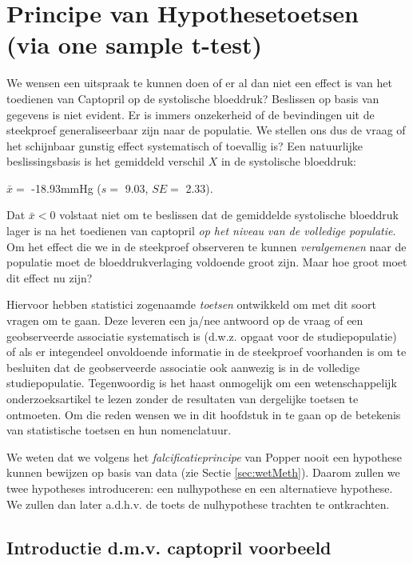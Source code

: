 \documentclass[
  12pt,dutch,coursenotes]{book}
\theoremstyle{definition}
\theoremstyle{definition}
\theoremstyle{definition}
\theoremstyle{remark}
\begin{document}
\hypertarget{principe-van-hypothesetoetsen-via-one-sample-t-test}{%
\section{Principe van Hypothesetoetsen (via one sample t-test)}\label{principe-van-hypothesetoetsen-via-one-sample-t-test}}

We wensen een uitspraak te kunnen doen of er al dan niet een effect is van het toedienen van Captopril op de systolische bloeddruk? Beslissen op basis van gegevens is niet evident. Er is immers onzekerheid of de bevindingen uit de steekproef
generaliseerbaar zijn naar de populatie. We stellen ons dus de vraag of het schijnbaar gunstig effect systematisch of toevallig is?
Een natuurlijke beslissingsbasis is het gemiddeld verschil \(X\) in de systolische bloeddruk:

\(\bar x=\) -18.93mmHg (\(s =\) 9.03, \(SE =\) 2.33).

Dat \(\bar{x}< 0\) volstaat niet om te beslissen dat de gemiddelde systolische bloeddruk lager is na het toedienen van captopril \emph{op het niveau van de volledige populatie}. Om het effect die we in de steekproef observeren te kunnen \emph{veralgemenen} naar de populatie moet de bloeddrukverlaging voldoende groot zijn. Maar hoe groot moet dit effect nu zijn?

Hiervoor hebben statistici zogenaamde \emph{toetsen} ontwikkeld om met dit soort vragen om te gaan. Deze leveren een ja/nee antwoord op de vraag of een geobserveerde associatie systematisch is (d.w.z. opgaat voor de studiepopulatie) of als er integendeel onvoldoende informatie in de steekproef voorhanden is om te besluiten dat de geobserveerde associatie ook aanwezig is in de volledige studiepopulatie. Tegenwoordig is het
haast onmogelijk om een wetenschappelijk onderzoeksartikel te lezen zonder
de resultaten van dergelijke toetsen te ontmoeten. Om die reden wensen we in
dit hoofdstuk in te gaan op de betekenis van statistische toetsen en hun
nomenclatuur.

We weten dat we volgens het \emph{falcificatieprincipe} van Popper nooit een hypothese kunnen bewijzen op basis van data (zie Sectie \ref{sec:wetMeth}).
Daarom zullen we twee hypotheses introduceren: een nulhypothese en een alternatieve hypothese.
We zullen dan later a.d.h.v. de toets de nulhypothese trachten te ontkrachten.

\hypertarget{introductie-d.m.v.-captopril-voorbeeld}{%
\subsection{Introductie d.m.v. captopril voorbeeld}\label{introductie-d.m.v.-captopril-voorbeeld}}
\end{document}
